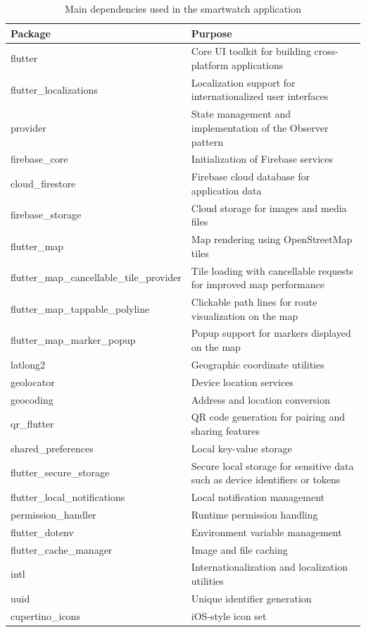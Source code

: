 \clearpage
\begin{table}[h]
\centering
\begin{tabular}{|l|p{9cm}|}
\hline
\textbf{Package} & \textbf{Purpose} \\
\hline

flutter & Core UI toolkit for building cross-platform applications \\
\hline
flutter\_localizations & Localization support for internationalized user interfaces \\
\hline
provider & State management and implementation of the Observer pattern \\
\hline
firebase\_core & Initialization of Firebase services \\
\hline
cloud\_firestore & Firebase cloud database for application data \\
\hline
firebase\_storage & Cloud storage for images and media files \\
\hline
flutter\_map & Map rendering using OpenStreetMap tiles \\
\hline
flutter\_map\_cancellable\_tile\_provider & Tile loading with cancellable requests for improved map performance \\
\hline
flutter\_map\_tappable\_polyline & Clickable path lines for route visualization on the map \\
\hline
flutter\_map\_marker\_popup & Popup support for markers displayed on the map \\
\hline
latlong2 & Geographic coordinate utilities \\
\hline
geolocator & Device location services \\
\hline
geocoding & Address and location conversion \\
\hline
qr\_flutter & QR code generation for pairing and sharing features \\
\hline
shared\_preferences & Local key-value storage \\
\hline
flutter\_secure\_storage & Secure local storage for sensitive data such as device identifiers or tokens \\
\hline
flutter\_local\_notifications & Local notification management \\
\hline
permission\_handler & Runtime permission handling \\
\hline
flutter\_dotenv & Environment variable management \\
\hline
flutter\_cache\_manager & Image and file caching \\
\hline
intl & Internationalization and localization utilities \\
\hline
uuid & Unique identifier generation \\
\hline
cupertino\_icons & iOS-style icon set \\
\hline

\end{tabular}
\caption{Main dependencies used in the smartwatch application}
\end{table}
\clearpage


